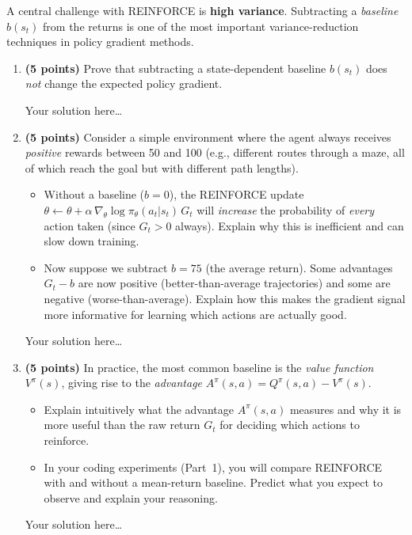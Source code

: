 \documentclass[11pt]{article}
\begin{document}
A central challenge with REINFORCE is \textbf{high variance}.
Subtracting a \emph{baseline} $b(s_t)$ from the returns is one of the
most important variance-reduction techniques in policy gradient methods.

\begin{enumerate}[label=(\alph*)]
\item \textbf{(5 points)} Prove that subtracting a state-dependent baseline
$b(s_t)$ does \emph{not} change the expected policy gradient.

\begin{solution}
Your solution here\ldots
\end{solution}

\item \textbf{(5 points)} Consider a simple environment where the agent
always receives \emph{positive} rewards between 50 and 100 (e.g., different
routes through a maze, all of which reach the goal but with different
path lengths).
\begin{itemize}
  \item Without a baseline ($b=0$), the REINFORCE update
    $\theta \leftarrow \theta + \alpha\,\nabla_\theta
    \log\pi_\theta(a_t|s_t)\,G_t$
    will \emph{increase} the probability of \emph{every} action taken
    (since $G_t > 0$ always).
    Explain why this is inefficient and can slow down training.
  \item Now suppose we subtract $b = 75$ (the average return).  Some
    advantages $G_t - b$ are now positive (better-than-average trajectories)
    and some are negative (worse-than-average).  Explain how this makes the
    gradient signal more informative for learning which actions are
    actually good.
\end{itemize}

\begin{solution}
Your solution here\ldots
\end{solution}

\item \textbf{(5 points)} In practice, the most common baseline is the
\emph{value function} $V^\pi(s)$, giving rise to the \emph{advantage}
$A^\pi(s,a) = Q^\pi(s,a) - V^\pi(s)$.
\begin{itemize}
  \item Explain intuitively what the advantage $A^\pi(s,a)$ measures
        and why it is more useful than the raw return $G_t$ for deciding
        which actions to reinforce.
  \item In your coding experiments (Part~1), you will compare REINFORCE
        with and without a mean-return baseline.  Predict what you expect
        to observe and explain your reasoning.
\end{itemize}

\begin{solution}
Your solution here\ldots
\end{solution}
\end{enumerate}
\end{document}
